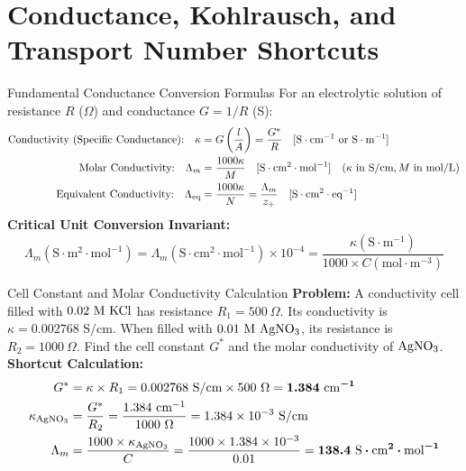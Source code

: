 \documentclass[11pt,a4paper]{report}
\newcommand{\ans}[1]{\ifmmode\bm{#1}\else\textbf{#1}\fi}
\begin{document}
\chapter{Conductance, Kohlrausch, and Transport Number Shortcuts}

\begin{shortcutbox}{Fundamental Conductance Conversion Formulas}
For an electrolytic solution of resistance $R$ ($\Omega$) and conductance $G = 1/R$ (S):
\begin{align}
\text{Conductivity (Specific Conductance):} \quad \kappa &= G \left(\frac{l}{A}\right) = \frac{G^*}{R} \quad [\text{S}\cdot\text{cm}^{-1}\text{ or S}\cdot\text{m}^{-1}] \\
\text{Molar Conductivity:} \quad \Lambda_m &= \frac{1000 \kappa}{M} \quad [\text{S}\cdot\text{cm}^2\cdot\text{mol}^{-1}] \quad (\kappa \text{ in S/cm}, M \text{ in mol/L}) \\
\text{Equivalent Conductivity:} \quad \Lambda_{\rm eq} &= \frac{1000 \kappa}{N} = \frac{\Lambda_m}{z_+} \quad [\text{S}\cdot\text{cm}^2\cdot\text{eq}^{-1}]
\end{align}
\textbf{Critical Unit Conversion Invariant:}
\begin{equation}
\boxed{
\Lambda_m (\text{S}\cdot\text{m}^2\cdot\text{mol}^{-1}) = \Lambda_m (\text{S}\cdot\text{cm}^2\cdot\text{mol}^{-1}) \times 10^{-4} = \frac{\kappa (\text{S}\cdot\text{m}^{-1})}{1000 \times C (\text{mol}\cdot\text{m}^{-3})}
}
\end{equation}
\end{shortcutbox}

\begin{microbox}{Cell Constant and Molar Conductivity Calculation}
\textbf{Problem:} A conductivity cell filled with $0.02\text{ M }\ce{KCl}$ has resistance $R_1 = 500\ \Omega$. Its conductivity is $\kappa = 0.002768\text{ S/cm}$. When filled with $0.01\text{ M }\ce{AgNO3}$, its resistance is $R_2 = 1000\ \Omega$. Find the cell constant $G^*$ and the molar conductivity of $\ce{AgNO3}$.\\
\textbf{Shortcut Calculation:}
\begin{align*}
G^* &= \kappa \times R_1 = 0.002768\text{ S/cm} \times 500\ \Omega = \ans{1.384\text{ cm}^{-1}} \\
\kappa_{\ce{AgNO3}} &= \frac{G^*}{R_2} = \frac{1.384\text{ cm}^{-1}}{1000\ \Omega} = 1.384 \times 10^{-3}\text{ S/cm} \\
\Lambda_m &= \frac{1000 \times \kappa_{\ce{AgNO3}}}{C} = \frac{1000 \times 1.384 \times 10^{-3}}{0.01} = \ans{138.4\text{ S}\cdot\text{cm}^2\cdot\text{mol}^{-1}}
\end{align*}
\end{microbox}
\end{document}
